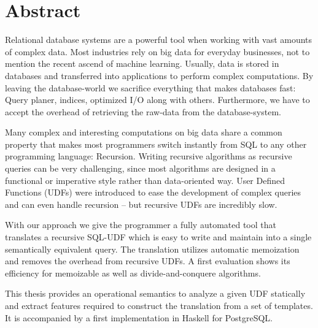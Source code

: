 \section*{Abstract}
Relational database systems are a powerful tool when working with vast amounts of complex data. Most industries rely on big data for everyday businesses, not to mention the recent ascend of machine learning. Usually, data is stored in databases and transferred into applications to perform complex computations. By leaving the database-world we sacrifice everything that makes databases fast: Query planer, indices, optimized I/O along with others. Furthermore, we have to accept the overhead of retrieving the raw-data from the database-system.

Many complex and interesting computations on big data share a common property that makes most programmers switch instantly from SQL to any other programming language: Recursion. Writing recursive algorithms as recursive queries can be very challenging, since most algorithms are designed in a functional or imperative style rather than data-oriented way. User Defined Functions (UDFs) were introduced to ease the development of complex queries and can even handle recursion -- but recursive UDFs are incredibly slow.

With our approach we give the programmer a fully automated tool that translates a recursive SQL-UDF which is easy to write and maintain into a single semantically equivalent query. The translation utilizes automatic memoization and removes the overhead from recursive UDFs. A first evaluation shows its efficiency for memoizable as well as divide-and-conquere algorithms. 

This thesis provides an operational semantics to analyze a given UDF statically and extract features required to construct the translation from a set of templates. It is accompanied by a first implementation in Haskell for PostgreSQL.